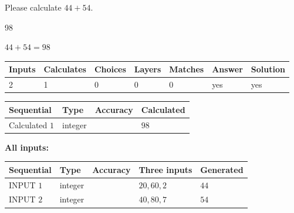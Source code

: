 \documentclass[12pt]{article}
\begin{document}
  
 
Please calculate $ %
44 +  %
54 $.
 
 
 
\noindent{}
 
 

98
 
 
\noindent{}
 
 

 
 
 
\noindent{}
 
 

$ %
44 +  %
54=   %
98$
 
 
\noindent{}
 
 

 
   
   
   
   
\noindent\begin{tabular}{|l|l|l|l|l|l|l|}
 \hline
Inputs & Calculates & Choices & Layers & Matches & Answer & Solution \\ \hline
 2  & 
 1  & 
 0
  & 
 0  & 
 0  & 
  yes & 
  yes 
  \\ \hline
 \end{tabular}
   
   
   
   
\noindent{}
   
   
  
  
\noindent\begin{tabular}{|l|l|l|l|}
\hline
 Sequential & Type & Accuracy & Calculated \\ 
\hline
 
 
  Calculated $  1 $ & integer &  & 
  $ 98 $ 
 \\  \hline  
 \end{tabular}
   
   
   
   
\noindent\vspace{0.1in}\hspace{-0.08in} {\textbf{\Large{All inputs: }}}
   
   
  
  
\noindent\begin{tabular}{|l|l|l|l|l|}
\hline
 Sequential & Type & Accuracy & Three inputs & Generated \\ 
\hline
 
 
  INPUT $  1 $ & integer &  & $
 20
 , 
 60
 , 
 2
 $ & $ 44 $ 
 \\  \hline  
 
 
  INPUT $  2 $ & integer &  & $
 40
 , 
 80
 , 
 7
 $ & $ 54 $ 
 \\  \hline  
 \end{tabular}
   
\end{document}
